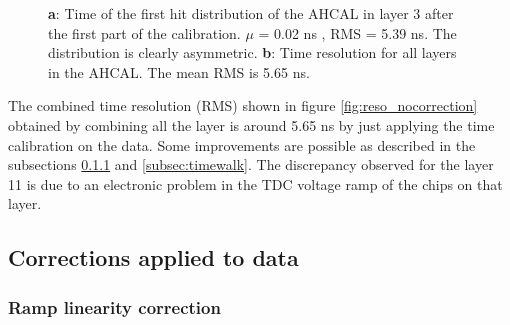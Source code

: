 \documentclass[twoside,a4paper,11pt]{article}
\begin{document}
\begin{figure}[htbp]
	\hfill
	\hfill
\caption[]{\textbf{a}: Time of the first hit distribution of the AHCAL in layer 3 after the first part of the calibration. $\mu$ = 0.02 ns , RMS = 5.39 ns. The distribution is clearly asymmetric. \textbf{b}: Time resolution for all layers in the AHCAL. The mean RMS is 5.65 ns.}
\end{figure}
The combined time resolution (RMS) shown in figure \ref{fig:reso_nocorrection} obtained by combining all the layer is around 5.65 ns by just applying the time calibration on the data. Some improvements are possible as described in the subsections \ref{subsec:lin_corr} and \ref{subsec:timewalk}. The discrepancy observed for the layer 11 is due to an electronic problem in the TDC voltage ramp of the chips on that layer.

\subsection{Corrections applied to data}
\subsubsection{Ramp linearity correction}
\label{subsec:lin_corr}
\end{document}
